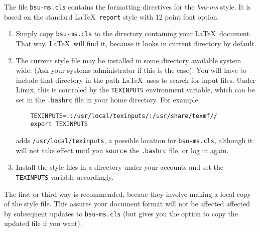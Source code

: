 \documentclass{bsu-ms}
\begin{document}
The file \texttt{bsu-ms.cls} contains the formatting directives for the
\emph{bsu-ms} style.  It is based on the standard \LaTeX\ \texttt{report} style
with 12 point font option.  
\begin{enumerate}
\item Simply copy \texttt{bsu-ms.cls} to the directory containing your \LaTeX\
document.  That way, \LaTeX\ will find it, because it looks in
current directory by default.  

\item The current style file may be installed in some directory available
system wide.  (Ask your systems administrator if this is the case).
You will have to include that directory in the path \LaTeX\ uses to search 
for input files.  Under Linux, this is controled by the \texttt{TEXINPUTS}
environment variable, which can be set in the \texttt{.bashrc} file in your 
home directory.  For example
%
\begin{verbatim}
    TEXINPUTS=.:/usr/local/texinputs/:/usr/share/texmf//
    export TEXINPUTS
\end{verbatim}
  adds \texttt{/usr/local/texinputs}, a possible location for
  \texttt{bsu-ms.cls}, although it will not take effect until you
  \texttt{source} the \texttt{.bashrc} file, or log in again.

\item Install the style files in a directory under your accounts and set the
\texttt{TEXINPUTS} variable accordingly.
\end{enumerate}
%
The first or third way is recommended, becaue they involve making a local copy
of the style file.  This assures your document format will not be affected
affected by subsequent updates to \texttt{bsu-ms.cls} (but gives you the
option to copy the updated file if you want).
\end{document}
